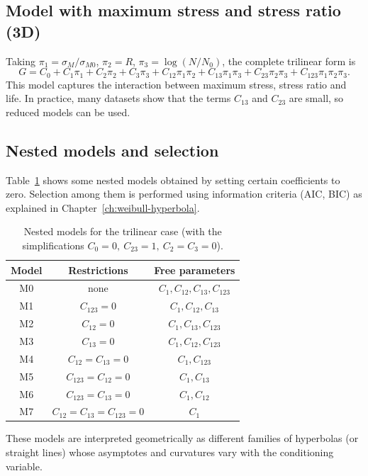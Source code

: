 \subsection{Model with maximum stress and stress ratio (3D)}

Taking \(\pi_1=\sigma_M/\sigma_{M0}\), \(\pi_2=R\), \(\pi_3=\log(N/N_0)\), the complete trilinear form is
\[
G = C_0 + C_1\pi_1 + C_2\pi_2 + C_3\pi_3 + C_{12}\pi_1\pi_2 + C_{13}\pi_1\pi_3 + C_{23}\pi_2\pi_3 + C_{123}\pi_1\pi_2\pi_3.
\]
This model captures the interaction between maximum stress, stress ratio and life. In practice, many datasets show that the terms \(C_{13}\) and \(C_{23}\) are small, so reduced models can be used.

\subsection{Nested models and selection}

Table~\ref{tab:nested-models} shows some nested models obtained by setting certain coefficients to zero. Selection among them is performed using information criteria (AIC, BIC) as explained in Chapter~\ref{ch:weibull-hyperbola}.

\begin{table}[htpb]
\centering
\caption{Nested models for the trilinear case (with the simplifications \(C_0=0,\ C_{23}=1,\ C_2=C_3=0\)).}
\label{tab:nested-models}
\begin{tabular}{@{}c c c@{}}
\toprule
\textbf{Model} & \textbf{Restrictions} & \textbf{Free parameters} \\
\midrule
M0 & none & \(C_1, C_{12}, C_{13}, C_{123}\) \\
M1 & \(C_{123}=0\) & \(C_1, C_{12}, C_{13}\) \\
M2 & \(C_{12}=0\) & \(C_1, C_{13}, C_{123}\) \\
M3 & \(C_{13}=0\) & \(C_1, C_{12}, C_{123}\) \\
M4 & \(C_{12}=C_{13}=0\) & \(C_1, C_{123}\) \\
M5 & \(C_{123}=C_{12}=0\) & \(C_1, C_{13}\) \\
M6 & \(C_{123}=C_{13}=0\) & \(C_1, C_{12}\) \\
M7 & \(C_{12}=C_{13}=C_{123}=0\) & \(C_1\) \\
\bottomrule
\end{tabular}
\end{table}

These models are interpreted geometrically as different families of hyperbolas (or straight lines) whose asymptotes and curvatures vary with the conditioning variable.

